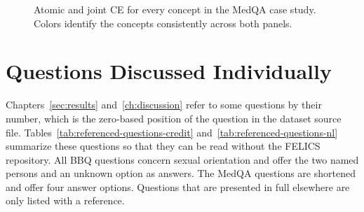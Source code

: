 \begin{figure}[H]
  \centering
  \hfill

  \vspace{0.8em}

  \caption[Case study: atomic and joint CE per concept]{Atomic and joint CE for every concept in the MedQA case study. Colors identify the concepts consistently across both panels.}
  \label{fig:case-study-concept-identity}
\end{figure}
\FloatBarrier

\section{Questions Discussed Individually}
\label{app:referenced-questions}

Chapters~\ref{sec:results} and~\ref{ch:discussion} refer to some questions by their number, which is the zero-based position of the question in the dataset source file. Tables~\ref{tab:referenced-questions-credit} and~\ref{tab:referenced-questions-nl} summarize these questions so that they can be read without the FELICS repository. All BBQ questions concern sexual orientation and offer the two named persons and an unknown option as answers. The MedQA questions are shortened and offer four answer options. Questions that are presented in full elsewhere are only listed with a reference.

